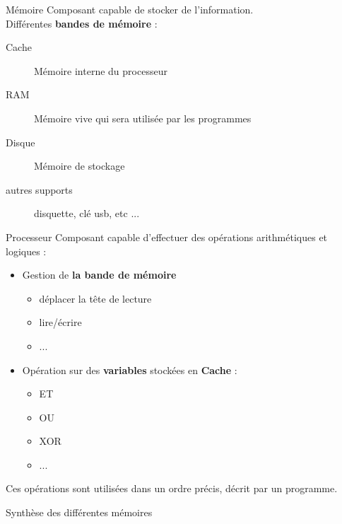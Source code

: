 \begin{frame}{Mémoire}
    Composant capable de stocker de l'information. \\
    \newline
    Différentes \textbf{bandes de mémoire} :
    \begin{description}
        \item[Cache] Mémoire interne du processeur
        \item[RAM] Mémoire vive qui sera utilisée par les programmes
        \item[Disque] Mémoire de stockage
        \item[autres supports] disquette, clé usb, etc ...
    \end{description}
\end{frame}

\begin{frame}{Processeur}
    Composant capable d'effectuer des opérations arithmétiques et logiques :
    \begin{itemize}
        \item Gestion de \textbf{la bande de mémoire}
        \begin{itemize}
            \item déplacer la tête de lecture
            \item lire/écrire
            \item ...
        \end{itemize}
        \item Opération sur des \textbf{variables} stockées en \textbf{Cache} :
        \begin{itemize}
            \item ET
            \item OU
            \item XOR
            \item ...
        \end{itemize}
    \end{itemize}
    Ces opérations sont utilisées dans un ordre précis, décrit par un programme.
\end{frame}

\begin{frame}{Synthèse des différentes mémoires}
\end{frame}
